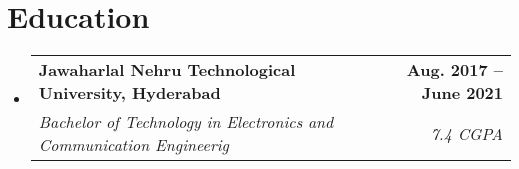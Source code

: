 \documentclass[letterpaper,11pt]{article}
\makeatletter
\newcommand{\resumeSubheading}[4]{
  \vspace{-2pt}\item
    \begin{tabular*}{1.0\textwidth}[t]{l@{\extracolsep{\fill}}r}
      \textbf{#1} & \textbf{\small #2} \\
      \textit{\small#3} & \textit{\small #4} \\
    \end{tabular*}\vspace{-7pt}
}
\newcommand{\resumeSubHeadingListStart}{\begin{itemize}[leftmargin=0.0in, label={}]}
\newcommand{\resumeSubHeadingListEnd}{\end{itemize}}
\makeatother
\begin{document}
\section{Education}
  \resumeSubHeadingListStart
    \resumeSubheading
      {Jawaharlal Nehru Technological University, Hyderabad}{Aug. 2017 -- June 2021}
      {Bachelor of Technology in Electronics and Communication Engineerig}{7.4 CGPA}
  \resumeSubHeadingListEnd
  
\end{document}
